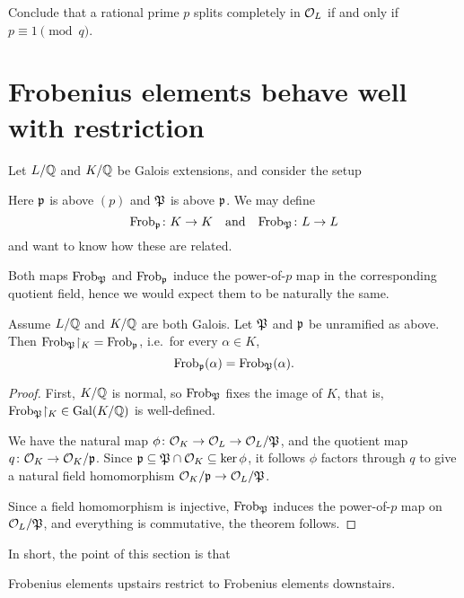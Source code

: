 \begin{ques}
	Conclude that a rational prime $p$
	splits completely in $\mathcal O_L$ if and only if $p \equiv 1 \pmod q$.
\end{ques}

\section{Frobenius elements behave well with restriction}
Let $L/\mathbb Q$ and $K/\mathbb Q$ be Galois extensions, and consider the setup
\begin{center}
\end{center}
Here $\mathfrak p$ is above $(p)$ and $\mathfrak P$ is above $\mathfrak p$.
We may define
\[ \mathrm{Frob}_\mathfrak p \colon K \to K
	\quad\text{and}\quad
	\mathrm{Frob}_{\mathfrak P} \colon L \to L \]
and want to know how these are related.

Both maps $\mathrm{Frob}_{\mathfrak P}$ and $\mathrm{Frob}_{\mathfrak p}$ induce the power-of-$p$ map in the corresponding quotient field, hence we would expect them to be naturally the same.

\begin{theorem}
	Assume $L/\mathbb Q$ and $K/\mathbb Q$ are both Galois.
	Let $\mathfrak P$ and $\mathfrak p$ be unramified as above.
	Then $\Frob_{\kP} \restrict{K} = \Frob_{\kp}$,
	i.e.\ for every $\alpha \in K$,
	\[ \mathrm{Frob}_\mathfrak p(\alpha) = \mathrm{Frob}_{\mathfrak P}(\alpha). \]
\end{theorem}
\begin{proof}
	First, $K/\mathbb Q$ is normal, so $\mathrm{Frob}_{\mathfrak P}$ fixes the image of $K$, that is,
	$\Frob_{\kP} \restrict{K} \in \Gal(K/\QQ)$ is well-defined.

	We have the natural map $\phi \colon \mathcal O_K \to \mathcal O_L \to \mathcal O_L/\mathfrak P$,
	and the quotient map $q\colon \mathcal O_K \to \mathcal O_K / \mathfrak p$.
	Since $\mathfrak p \subseteq \mathfrak P \cap \mathcal O_K \subseteq \ker \phi$, it follows $\phi$ factors
	through $q$ to give a natural field homomorphism $\mathcal O_K / \mathfrak p \to \mathcal O_L / \mathfrak P$.

	Since a field homomorphism is injective, $\mathrm{Frob}_{\mathfrak P}$ induces the power-of-$p$ map on $\mathcal O_L / \mathfrak P$, and everything is commutative, the theorem follows.
\end{proof}
In short, the point of this section is that
\begin{moral}
	Frobenius elements upstairs restrict to Frobenius elements downstairs.
\end{moral}

